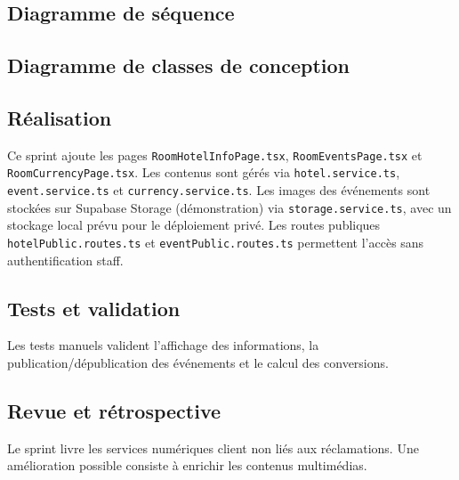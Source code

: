 
\subsection{Diagramme de séquence}

\subsection{Diagramme de classes de conception}

\subsection{Réalisation}
Ce sprint ajoute les pages \texttt{RoomHotelInfoPage.tsx}, \texttt{RoomEventsPage.tsx} et \texttt{RoomCurrencyPage.tsx}. Les contenus sont gérés via \texttt{hotel.service.ts}, \texttt{event.service.ts} et \texttt{currency.service.ts}. Les images des événements sont stockées sur Supabase Storage (démonstration) via \texttt{storage.service.ts}, avec un stockage local prévu pour le déploiement privé. Les routes publiques \texttt{hotelPublic.routes.ts} et \texttt{eventPublic.routes.ts} permettent l'accès sans authentification staff.


\subsection{Tests et validation}
Les tests manuels valident l'affichage des informations, la publication/dépublication des événements et le calcul des conversions.

\subsection{Revue et rétrospective}
Le sprint livre les services numériques client non liés aux réclamations. Une amélioration possible consiste à enrichir les contenus multimédias.


